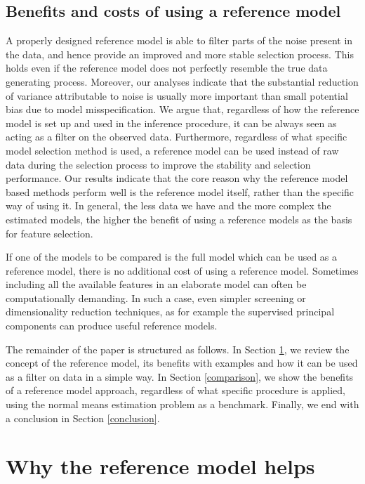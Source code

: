 \documentclass[american,]{article}
\theoremstyle{definition}
\begin{document}
\subsection{Benefits and costs of using a reference model}

A properly designed reference model is able to filter parts of the
noise present in the data, and hence provide an improved and more
stable selection process. This holds even if the reference model does
not perfectly resemble the true data generating process. Moreover, our
analyses indicate that the substantial reduction of variance
attributable to noise is usually more important than small potential
bias due to model misspecification.  We argue that, regardless of how
the reference model is set up and used in the inference procedure, it
can be always seen as acting as a filter on the observed
data. Furthermore, regardless of what specific model selection method
is used, a reference model can be used instead of raw data during the
selection process to improve the stability and selection
performance. Our results indicate that the core reason why the
reference model based methods perform well is the reference model
itself, rather than the specific way of using it.  In general, the
less data we have and the more complex the estimated models, the
higher the benefit of using a reference models as the basis for
feature selection.

If one of the models to be compared is the full model which can be
used as a reference model, there is no additional cost of using a
reference model. Sometimes including all the available features in an
elaborate model can often be computationally demanding.  In such a
case, even simpler screening or dimensionality reduction techniques,
as for example the supervised principal components
\citep{bair2006prediction,piironen2018} can produce useful reference
models.

The remainder of the paper is structured as follows. In Section
\ref{reference-model-approach}, we review the concept of the reference
model, its benefits with examples and how it can be used as a filter
on data in a simple way. In Section \ref{comparison}, we show the
benefits of a reference model approach, regardless of what specific
procedure is applied, using the normal means estimation problem as a
benchmark. Finally, we end with a conclusion in Section
\ref{conclusion}.


\hypertarget{reference-model-approach}{%
\section{Why the reference model helps}\label{reference-model-approach}}
 
\end{document}
